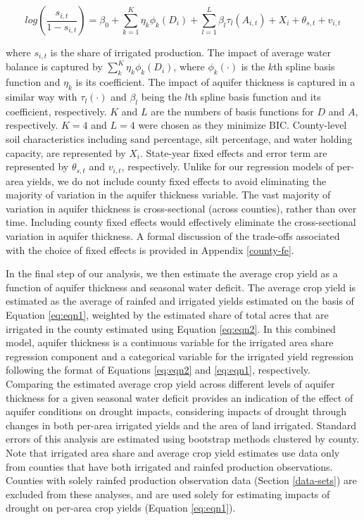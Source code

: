 \documentclass[
]{article}
\begin{document}
\begin{equation}
    log(\frac{s_{i,t}}{1-s_{i,t}}) = \beta_0 + \sum_{k=1}^K \eta_{k}\phi_{k}(D_{i}) + \sum_{l=1}^L \beta_{l}\tau_{l}(A_{i,t}) + X_i + \theta_{s,t} + v_{i,t} \label{eq:eqn2}
\end{equation}

where \(s_{i,t}\) is the share of irrigated production. The impact of average water balance is captured by \(\sum_{k}^K \eta_{k}\phi_{k}(D_{i})\), where \(\phi_{k}(\cdot)\) is the \(k\)th spline basis function and \(\eta_{k}\) is its coefficient. The impact of aquifer thickness is captured in a similar way with \(\tau_{l}(\cdot)\) and \(\beta_{l}\) being the \(l\)th spline basis function and its coefficient, respectively. $K$ and $L$ are the numbers of basis functions for $D$ and $A$, respectively. $K = 4$ and $L = 4$ were chosen as they minimize BIC. County-level soil characteristics including sand percentage, silt percentage, and water holding capacity, are represented by \(X_i\). State-year fixed effects and error term are represented by \(\theta_{s,t}\) and \(v_{i,t}\), respectively. Unlike for our regression models of per-area yields, we do not include county fixed effects to avoid eliminating the majority of variation in the aquifer thickness variable. The vast majority of variation in aquifer thickness is cross-sectional (across counties), rather than over time. Including county fixed effects would effectively eliminate the cross-sectional variation in aquifer thickness. A formal discussion of the trade-offs associated with the choice of fixed effects is provided in Appendix \ref{county-fe}.

In the final step of our analysis, we then estimate the average crop yield as a function of aquifer thickness and seasonal water deficit. The average crop yield is estimated as the average of rainfed and irrigated yields estimated on the basis of Equation \eqref{eq:eqn1}, weighted by the estimated share of total acres that are irrigated in the county estimated using Equation \eqref{eq:eqn2}. In this combined model, aquifer thickness is a continuous variable for the irrigated area share regression component and a categorical variable for the irrigated yield regression following the format of Equations \eqref{eq:eqn2} and \eqref{eq:eqn1}, respectively. Comparing the estimated average crop yield across different levels of aquifer thickness for a given seasonal water deficit provides an indication of the effect of aquifer conditions on drought impacts, considering impacts of drought through changes in both per-area irrigated yields and the area of land irrigated. Standard errors of this analysis are estimated using bootstrap methods clustered by county. Note that irrigated area share and average crop yield estimates use  data only from counties that have both irrigated and rainfed production observations. Counties with solely rainfed production observation data (Section \ref{data-sets}) are excluded from these analyses, and are used solely for estimating impacts of drought on per-area crop yields (Equation \ref{eq:eqn1}).
\end{document}
